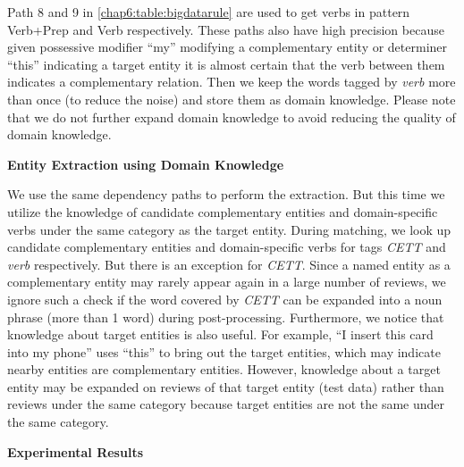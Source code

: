 Path 8 and 9 in \ref{chap6:table:bigdatarule} are used to get verbs in pattern Verb+Prep and Verb respectively. These paths also have high precision because given possessive modifier ``my'' modifying a complementary entity or determiner ``this'' indicating a target entity it is almost certain that the verb between them indicates a complementary relation. Then we keep the words tagged by \textit{verb} more than once (to reduce the noise) and store them as domain knowledge. Please note that we do not further expand domain knowledge to avoid reducing the quality of domain knowledge. 

\textbf{Entity Extraction using Domain Knowledge}

We use the same dependency paths to perform the extraction. But this time we utilize the knowledge of candidate complementary entities and domain-specific verbs under the same category as the target entity. During matching, we look up candidate complementary entities and domain-specific verbs for tags \textit{CETT} and \textit{verb} respectively. But there is an exception for \textit{CETT}. Since a named entity as a complementary entity may rarely appear again in a large number of reviews, we ignore such a check if the word covered by \textit{CETT} can be expanded into a noun phrase (more than 1 word) during post-processing. Furthermore, we notice that knowledge about target entities is also useful. For example, ``I insert this card into my phone'' uses ``this'' to bring out the target entities, which may indicate nearby entities are complementary entities. However, knowledge about a target entity may be expanded on reviews of that target entity (test data) rather than reviews under the same category because target entities are not the same under the same category.

\textbf{Experimental Results}
\label{chap6:sec:cer:exp}

\begin{table}
\centering
{}
\caption{Statistics of the CER dataset}
\label{table:testingdata}
\end{table}

